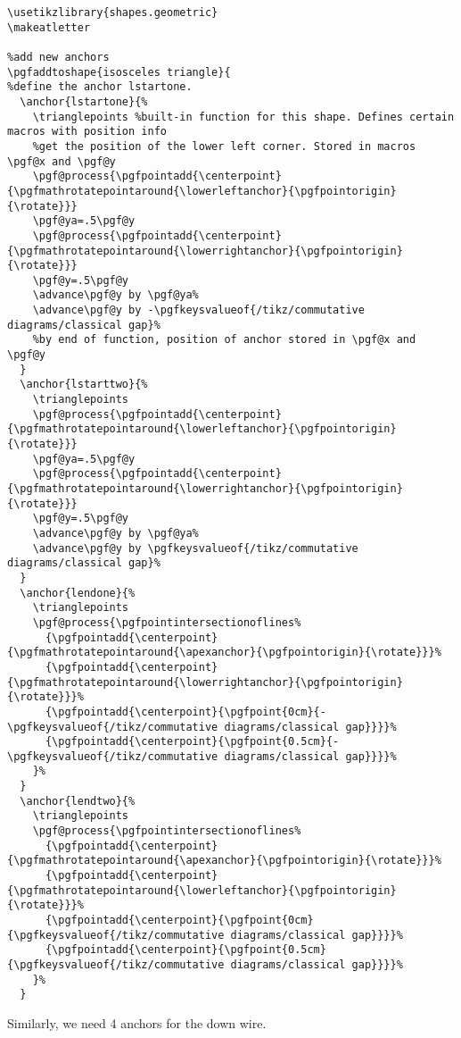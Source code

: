 \documentclass[aps,pra,10pt,nofootinbib]{revtex4-2}
\begin{document}
\begin{FullCode}
  \begin{lstlisting}
\usetikzlibrary{shapes.geometric}
\makeatletter

%add new anchors
\pgfaddtoshape{isosceles triangle}{
%define the anchor lstartone.
  \anchor{lstartone}{%
    \trianglepoints %built-in function for this shape. Defines certain macros with position info
    %get the position of the lower left corner. Stored in macros \pgf@x and \pgf@y
    \pgf@process{\pgfpointadd{\centerpoint}{\pgfmathrotatepointaround{\lowerleftanchor}{\pgfpointorigin}{\rotate}}}
    \pgf@ya=.5\pgf@y
    \pgf@process{\pgfpointadd{\centerpoint}{\pgfmathrotatepointaround{\lowerrightanchor}{\pgfpointorigin}{\rotate}}}
    \pgf@y=.5\pgf@y
    \advance\pgf@y by \pgf@ya%
    \advance\pgf@y by -\pgfkeysvalueof{/tikz/commutative diagrams/classical gap}%
    %by end of function, position of anchor stored in \pgf@x and \pgf@y
  }
  \anchor{lstarttwo}{%
    \trianglepoints
    \pgf@process{\pgfpointadd{\centerpoint}{\pgfmathrotatepointaround{\lowerleftanchor}{\pgfpointorigin}{\rotate}}}
    \pgf@ya=.5\pgf@y
    \pgf@process{\pgfpointadd{\centerpoint}{\pgfmathrotatepointaround{\lowerrightanchor}{\pgfpointorigin}{\rotate}}}
    \pgf@y=.5\pgf@y
    \advance\pgf@y by \pgf@ya%
    \advance\pgf@y by \pgfkeysvalueof{/tikz/commutative diagrams/classical gap}%
  }
  \anchor{lendone}{%
    \trianglepoints
    \pgf@process{\pgfpointintersectionoflines%
      {\pgfpointadd{\centerpoint}{\pgfmathrotatepointaround{\apexanchor}{\pgfpointorigin}{\rotate}}}%
      {\pgfpointadd{\centerpoint}{\pgfmathrotatepointaround{\lowerrightanchor}{\pgfpointorigin}{\rotate}}}%
      {\pgfpointadd{\centerpoint}{\pgfpoint{0cm}{-\pgfkeysvalueof{/tikz/commutative diagrams/classical gap}}}}%
      {\pgfpointadd{\centerpoint}{\pgfpoint{0.5cm}{-\pgfkeysvalueof{/tikz/commutative diagrams/classical gap}}}}%
    }%
  }
  \anchor{lendtwo}{%
    \trianglepoints
    \pgf@process{\pgfpointintersectionoflines%
      {\pgfpointadd{\centerpoint}{\pgfmathrotatepointaround{\apexanchor}{\pgfpointorigin}{\rotate}}}%
      {\pgfpointadd{\centerpoint}{\pgfmathrotatepointaround{\lowerleftanchor}{\pgfpointorigin}{\rotate}}}%
      {\pgfpointadd{\centerpoint}{\pgfpoint{0cm}{\pgfkeysvalueof{/tikz/commutative diagrams/classical gap}}}}%
      {\pgfpointadd{\centerpoint}{\pgfpoint{0.5cm}{\pgfkeysvalueof{/tikz/commutative diagrams/classical gap}}}}%
    }%
  }
  \end{lstlisting}
\end{FullCode}
Similarly, we need 4 anchors for the down wire.
\end{document}
